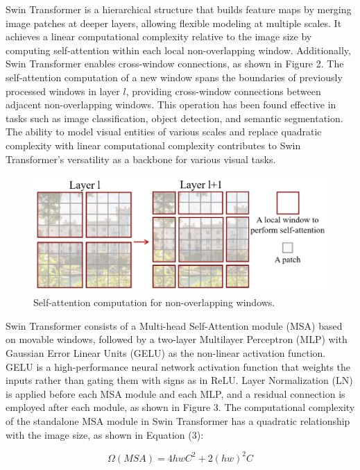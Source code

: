 \documentclass[10pt,twocolumn,letterpaper]{article}
\begin{document}
Swin Transformer\cite{ST} is a hierarchical structure that builds feature maps by merging image patches at deeper layers, allowing flexible modeling at multiple scales. It achieves a linear computational complexity relative to the image size by computing self-attention within each local non-overlapping window. Additionally, Swin Transformer enables cross-window connections, as shown in Figure 2. The self-attention computation of a new window spans the boundaries of previously processed windows in layer $l$, providing cross-window connections between adjacent non-overlapping windows. This operation has been found effective in tasks such as image classification, object detection, and semantic segmentation. The ability to model visual entities of various scales and replace quadratic complexity with linear computational complexity contributes to Swin Transformer's versatility as a backbone for various visual tasks.

\begin{figure}[htbp]   %
	\centering
	\includegraphics[width=\linewidth,scale=1.00]{Images/ST_1.png}
	\caption{Self-attention computation for non-overlapping windows.}
	\label{fig:st_1}
\end{figure}

Swin Transformer consists of a Multi-head Self-Attention module (MSA) based on movable windows, followed by a two-layer Multilayer Perceptron (MLP) with Gaussian Error Linear Units (GELU) as the non-linear activation function. GELU is a high-performance neural network activation function that weights the inputs rather than gating them with signs as in ReLU. Layer Normalization (LN) is applied before each MSA module and each MLP, and a residual connection is employed after each module, as shown in Figure 3.
The computational complexity of the standalone MSA module in Swin Transformer has a quadratic relationship with the image size, as shown in Equation (3):


\begin{equation}
  \Omega(M S A)=4 h w C^2+2(h w)^2 C
\end{equation}
\end{document}
